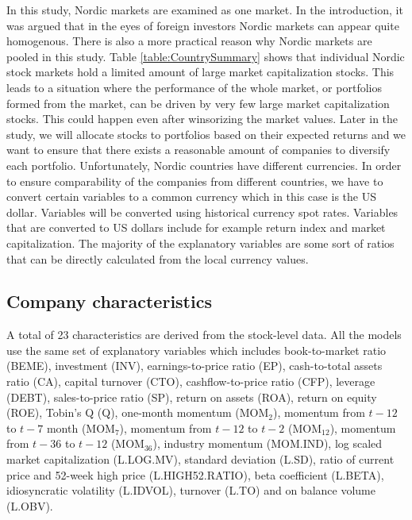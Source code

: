 \documentclass[12pt]{article}
\begin{document}
In this study, Nordic markets are examined as one market. In the introduction, it was argued that in the eyes of foreign investors Nordic markets can appear quite homogenous. There is also a more practical reason why Nordic markets are pooled in this study. Table \ref{table:CountrySummary} shows that individual Nordic stock markets hold a limited amount of large market capitalization stocks. This leads to a situation where the performance of the whole market, or portfolios formed from the market, can be driven by very few large market capitalization stocks. This could happen even after winsorizing the market values. Later in the study, we will allocate stocks to portfolios based on their expected returns and we want to ensure that there exists a reasonable amount of companies to diversify each portfolio. Unfortunately, Nordic countries have different currencies. In order to ensure comparability of the companies from different countries, we have to convert certain variables to a common currency which in this case is the US dollar. Variables will be converted using historical currency spot rates. Variables that are converted to US dollars include for example return index and market capitalization. The majority of the explanatory variables are some sort of ratios that can be directly calculated from the local currency values. \par

\subsection{Company characteristics}\label{CompanyCharacteristics}

A total of 23 characteristics are derived from the stock-level data. All the models use the same set of explanatory variables which includes book-to-market ratio (BEME), investment (INV), earnings-to-price ratio (EP), cash-to-total assets ratio (CA), capital turnover (CTO), cashflow-to-price ratio (CFP), leverage (DEBT), sales-to-price ratio (SP), return on assets (ROA), return on equity (ROE), Tobin's Q (Q), one-month momentum (MOM$_2$), momentum from $t-12$ to $t-7$ month (MOM$_7$), momentum from $t-12$ to $t-2$ (MOM$_{12}$), momentum from $t-36$ to $t-12$ (MOM$_{36}$), industry momentum (MOM.IND), log scaled market capitalization (L.LOG.MV), standard deviation (L.SD), ratio of current price and 52-week high price (L.HIGH52.RATIO), beta coefficient (L.BETA), idiosyncratic volatility (L.IDVOL), turnover (L.TO) and on balance volume (L.OBV). \par
\end{document}
